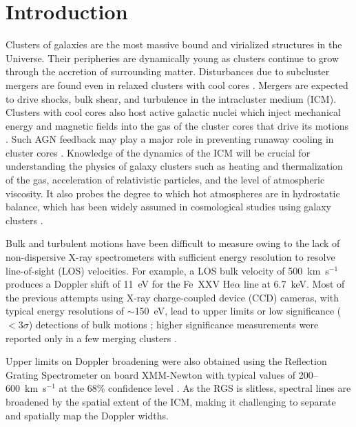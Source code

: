 \section{Introduction}
\label{sec:intro}

Clusters of galaxies are the most massive bound and virialized structures in the Universe. Their peripheries are dynamically young as clusters continue to grow through the accretion of surrounding matter. Disturbances due to subcluster mergers are found even in relaxed clusters with cool cores \citep[e.g.,][]{markevitch01,Churazov03,Clarke04,Blanton11,Ueda17}. Mergers are expected to drive shocks, bulk shear, and turbulence in the intracluster medium (ICM). Clusters with cool cores also host active galactic nuclei \citep[AGN;][]{Burns90,Sun09} which inject mechanical energy and magnetic fields into the gas of the cluster cores that drive its motions \citep[e.g.,][]{Boehringer93,Carilli94,Churazov00,McNamara00,Fabian03,Werner10}. Such AGN feedback may play a major role in preventing runaway cooling in cluster cores \citep[see][for reviews]{McNamara07,Fabian12}. Knowledge of the dynamics of the ICM will be crucial for understanding the physics of galaxy clusters such as heating and thermalization of the gas, acceleration of relativistic particles, and the level of atmospheric viscosity. It also probes the degree to which hot atmospheres are in hydrostatic balance, which has been widely assumed in cosmological studies using galaxy clusters \citep[see][for review]{Allen11}.

Bulk and turbulent motions have been difficult to measure owing to the lack of non-dispersive X-ray spectrometers with sufficient energy resolution to resolve line-of-sight (LOS) velocities. For example, a LOS bulk velocity of 500~km~s$^{-1}$ produces a Doppler shift of 11~eV for the Fe~XXV He$\alpha$ line at 6.7~keV. Most of the previous attempts using X-ray charge-coupled device (CCD) cameras, with typical energy resolutions of $\sim$150~eV, lead to upper limits or low significance ($< 3\sigma$) detections of bulk motions \citep[e.g.,][]{Dupke06,Ota07,Dupke07,Fujita08,Sato08,Sato11,Sugawara09,Nishino12,Tamura14,Ota16}; higher significance measurements were reported only in a few merging clusters \citep{Tamura11,Liu16}.

Upper limits on Doppler broadening were also obtained using the Reflection Grating Spectrometer on board XMM-Newton \citep[RGS;][]{den_Herder01} with typical values of 200--600~km~s$^{-1}$ at the 68\% confidence level \citep{Sanders10,Sanders11,bulbul12,Sanders13,Pinto15}. As the RGS is slitless, spectral lines are broadened by the spatial extent of the ICM, making it challenging to separate and spatially map the Doppler widths.


